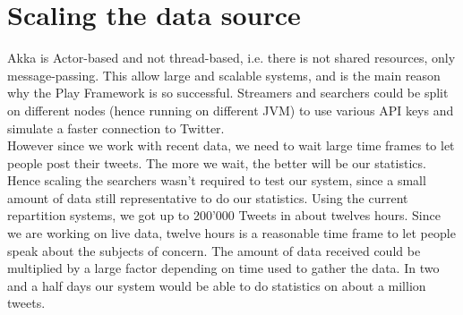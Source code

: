 \section{Scaling the data source}

Akka is Actor-based and not thread-based, i.e. there is not shared resources, only message-passing. This allow large and scalable systems, and is the main reason why the Play Framework is so successful. Streamers and searchers could be split on different nodes (hence running on different JVM) to use various API keys and simulate a faster connection to Twitter.\\

However since we work with recent data, we need to wait large time frames to let people post their tweets. The more we wait, the better will be our statistics. \\

Hence scaling the searchers wasn't required to test our system, since a small amount of data still representative to do our statistics. Using the current repartition systems, we got up to 200'000 Tweets in about twelves hours. Since we are working on live data, twelve hours is a reasonable time frame to let people speak about the subjects of concern. The amount of data received could be multiplied by a large factor depending on time used to gather the data. In two and a half days our system would be able to do statistics on about a million tweets.